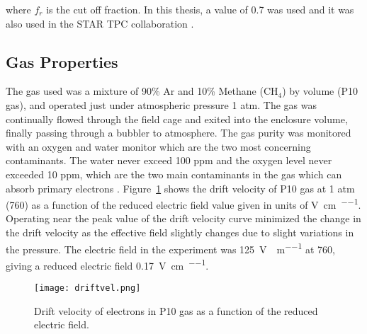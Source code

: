 where $f_r$ is the cut off fraction. In this thesis, a value of 0.7 was used and it was also used in the STAR TPC collaboration \cite{starsyst}. 








\subsection{Gas Properties}
The gas used was a mixture of 90\% Ar and 10\% Methane ($\mathrm{CH_4}$) by volume (P10 gas), and operated just under atmospheric pressure 1 atm. The gas was continually flowed through the field cage and exited into the enclosure volume, finally passing through a bubbler to atmosphere. The gas purity was monitored with an oxygen and water monitor which are the two most concerning contaminants. The water never exceed  100 ppm  and the oxygen level never exceeded 10 ppm, which are the two main contaminants in the gas which can absorb primary electrons \cite{tpcAging}. Figure~\ref{fig:driftvel} shows the drift velocity of P10 gas at 1 atm (\SI{760}{\torr}) as a function of the reduced electric field value given in units of \si{\volt\per\centi\metre\per\torr}. Operating near the peak value of the drift velocity curve minimized the change in the drift velocity as the effective field slightly changes due to slight variations in the pressure. The electric field in the experiment was \SI{125}{\volt\per\centi\per\metre} at \SI{760}{\torr}, giving a reduced electric field \SI{0.17}{\volt\per\centi\metre\per\torr}.

\begin{figure}[H]
\texttt{[image: driftvel.png]}
\caption{Drift velocity of electrons in P10 gas as a function of the reduced electric field.}
\label{fig:driftvel}
\end{figure}

